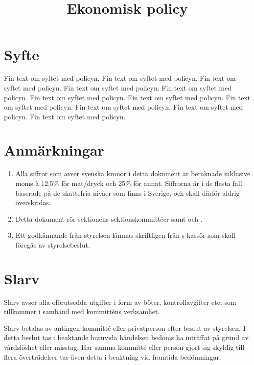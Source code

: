 \documentclass[11pt, includeaddress]{../../classes/cthit}
\begin{document}
\title{Ekonomisk policy}
\maketitle

\thispagestyle{empty}

\newpage

\makeheadfoot%

\setcounter{tocdepth}{2}
\setcounter{page}{1}
\tableofcontents

\newpage

\section{Syfte}
Fin text om syftet med policyn. Fin text om syftet med policyn. Fin text om syftet med policyn. Fin text om syftet med policyn. Fin text om syftet med policyn. Fin text om syftet med policyn. Fin text om syftet med policyn. Fin text om syftet med policyn. Fin text om syftet med policyn. Fin text om syftet med policyn. Fin text om syftet med policyn.

\section{Anmärkningar}
\begin{enumerate}
	\item Alla siffror som avser svenska kronor i detta dokument är beräknade inklusive moms à 12,5\% för mat/dryck och 25\% för annat. Siffrorna är i de flesta fall baserade på de skattefria nivåer som finns i Sverige, och skall därför aldrig överskridas.
	\item Detta dokument rör sektionens sektionskommittéer samt \STYRITFULL{} och \SNITFULL{}. 
	\item Ett godkännande från styrelsen lämnas skriftligen från \STYRIT{}s kassör som skall föregås av styrelsebeslut.
\end{enumerate}

\section{Slarv}
Slarv avser alla oförutsedda utgifter i form av böter, kontrollavgifter etc. som tillkommer i samband med kommitténs verksamhet. 

Slarv betalas av antingen kommitté eller privatperson efter beslut av styrelsen. I detta beslut tas i beaktande huruvida händelsen bedöms ha inträffat på grund av vårdslöshet eller misstag. Har samma kommitté eller person gjort sig skyldig till flera överträdelser tas även detta i beaktning vid framtida bedömningar.
\end{document}
